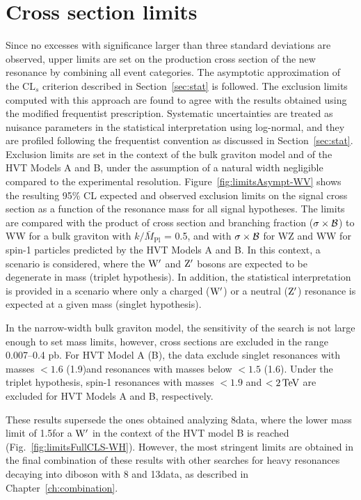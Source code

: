 \section{Cross section limits}

Since no excesses with significance larger than three standard deviations are observed, upper limits are set on the production cross section of the new resonance by combining all event categories.
The asymptotic approximation of the $\mathrm{CL}_s$ criterion described in Section~\ref{sec:stat} is followed.
The exclusion limits computed with this approach are found to agree with the results obtained using the modified frequentist prescription.
Systematic uncertainties are treated as nuisance parameters in the statistical interpretation using log-normal, and they are profiled following the frequentist convention as discussed in Section~\ref{sec:stat}.\\

Exclusion limits are set in the context of the bulk graviton model and of the HVT Models A and B, under the assumption of a natural width negligible compared to the experimental resolution.
Figure~\ref{fig:limitsAsympt-WV} shows the resulting 95\% CL expected and observed exclusion limits on the signal cross section as a function of the resonance mass for all signal hypotheses.
The limits are compared with the product of cross section and branching fraction ($\sigma\times\cal{B}$) to WW for a bulk graviton with $k/\bar{M}_\mathrm{Pl}$ = 0.5,
and with $\sigma\times\cal{B}$ for WZ and WW for spin-1 particles predicted by the HVT Models A and B.
In this context, a scenario is considered, where the $\mathrm{W}^\prime$ and $\mathrm{Z}^\prime$ bosons are expected to be degenerate in mass (triplet hypothesis).
In addition, the statistical interpretation is provided in a scenario where only a charged ($\mathrm{W}^\prime$) or a neutral ($\mathrm{Z}^\prime$) resonance is expected at a given mass (singlet hypothesis).

In the narrow-width bulk graviton model, the sensitivity of the search is not large enough to set mass limits, however, cross sections are excluded in the range 0.007--0.4 pb.
For HVT Model A (B), the data exclude singlet \Wpr resonances with masses $< 1.6$ (1.9)\TeV and \Zpr resonances with masses below $< 1.5$ (1.6)\TeV.
Under the triplet hypothesis, spin-1 resonances with masses $< 1.9$ and $< 2\,\text{Te\hspace{-.08em}V}$ are excluded for HVT Models A and B, respectively.

These results supersede the ones obtained analyzing 8\TeV data, where the lower mass limit of 1.5\TeV for a $\mathrm{W}^\prime$ in the context of the HVT model B is reached (Fig.~\ref{fig:limitsFullCLS-WH}).
However, the most stringent limits are obtained in the final combination of these results with other searches for heavy resonances decaying into diboson with 8 and 13\TeV data, as described in Chapter~\ref{ch:combination}.

